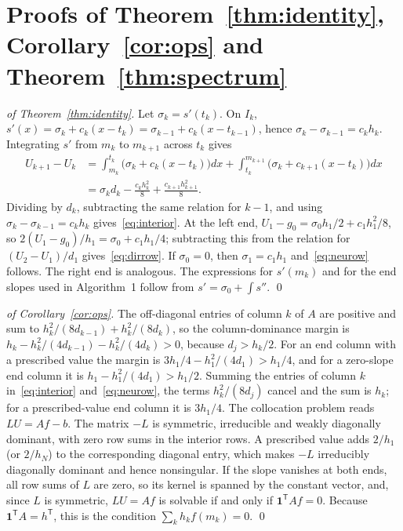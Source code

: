 \documentclass[smallextended,envcountsame]{svjour3}
\begin{document}
\section{Proofs of Theorem~\ref{thm:identity}, Corollary~\ref{cor:ops} and Theorem~\ref{thm:spectrum}}\label{app:proofs}
\begin{proof}[of Theorem~\ref{thm:identity}]
Let $\sigma_k=s'(t_k)$. On $I_k$, $s'(x)=\sigma_k+c_k(x-t_k)=\sigma_{k-1}+c_k(x-t_{k-1})$, hence
$\sigma_k-\sigma_{k-1}=c_kh_k$. Integrating $s'$ from $m_k$ to $m_{k+1}$ across $t_k$ gives
\begin{align*}
U_{k+1}-U_k&=\int_{m_k}^{t_k}\!\big(\sigma_k+c_k(x-t_k)\big)dx+\int_{t_k}^{m_{k+1}}\!\big(\sigma_k+c_{k+1}(x-t_k)\big)dx\\
&=\sigma_kd_k-\frac{c_kh_k^2}{8}+\frac{c_{k+1}h_{k+1}^2}{8}.
\end{align*}
Dividing by $d_k$, subtracting the same relation for $k-1$, and using $\sigma_k-\sigma_{k-1}=c_kh_k$
gives~\eqref{eq:interior}. At the left end, $U_1-g_0=\sigma_0h_1/2+c_1h_1^2/8$, so
$2(U_1-g_0)/h_1=\sigma_0+c_1h_1/4$; subtracting this from the relation for $(U_2-U_1)/d_1$
gives~\eqref{eq:dirrow}. If $\sigma_0=0$, then $\sigma_1=c_1h_1$ and~\eqref{eq:neurow} follows. The right
end is analogous. The expressions for $s'(m_k)$ and for the end slopes used in Algorithm~1 follow from
$s'=\sigma_0+\int s''$. \qed
\end{proof}

\begin{proof}[of Corollary~\ref{cor:ops}]
The off-diagonal entries of column $k$ of $A$ are positive and sum to $h_k^2/(8d_{k-1})+h_k^2/(8d_k)$, so
the column-dominance margin is $h_k-h_k^2/(4d_{k-1})-h_k^2/(4d_k)>0$, because $d_j>h_k/2$. For an end column
with a prescribed value the margin is $3h_1/4-h_1^2/(4d_1)>h_1/4$, and for a zero-slope end column it is
$h_1-h_1^2/(4d_1)>h_1/2$. Summing the entries of column $k$ in~\eqref{eq:interior} and~\eqref{eq:neurow}, the
terms $h_k^2/(8d_j)$ cancel and the sum is $h_k$; for a prescribed-value end column it is $3h_1/4$. The
collocation problem reads $LU=Af-b$. The matrix $-L$ is symmetric, irreducible and weakly diagonally
dominant, with zero row sums in the interior rows. A prescribed value adds $2/h_1$ (or $2/h_N$) to the
corresponding diagonal entry, which makes $-L$ irreducibly diagonally dominant and hence nonsingular. If
the slope vanishes at both ends, all row sums of $L$ are zero, so its kernel is spanned by the constant
vector, and, since $L$ is symmetric, $LU=Af$ is solvable if and only if $\mathbf 1^{\mathsf T}Af=0$. Because
$\mathbf 1^{\mathsf T}A=h^{\mathsf T}$, this is the condition $\sum_kh_kf(m_k)=0$. \qed
\end{proof}
\end{document}
